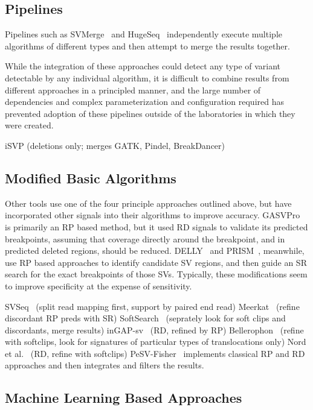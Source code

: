 \subsection{Pipelines}

Pipelines such as SVMerge~\cite{Wong:2010p1271} and HugeSeq~\cite{Lam:2012jy} independently execute multiple algorithms of different types and then attempt to merge the results together. 

While the integration of these approaches could detect any type of variant detectable by any individual algorithm, it is difficult to combine results from different approaches in a principled manner, and the large number of dependencies and complex parameterization and configuration required has prevented adoption of these pipelines outside of the laboratories in which they were created.

iSVP (deletions only; merges GATK, Pindel, BreakDancer)~\cite{Mimori:2013wx}

\subsection{Modified Basic Algorithms}

Other tools use one of the four principle approaches outlined above, but have incorporated other signals into their algorithms to improve accuracy. GASVPro~\cite{Sindi:2012kk} is primarily an RP based method, but it used RD signals to validate its predicted breakpoints, assuming that coverage directly around the breakpoint, and in predicted deleted regions, should be reduced. DELLY~\cite{Rausch:2012he} and PRISM~\cite{Jiang:2012cp}, meanwhile, use RP based approaches to identify candidate SV regions, and then guide an SR search for the exact breakpoints of those SVs. Typically, these modifications seem to improve specificity at the expense of sensitivity.

SVSeq~\cite{Zhang:2011ku} (split read mapping first, support by paired end read)
Meerkat~\cite{Yang:2013ih} (refine discordant RP preds with SR)
SoftSearch~\cite{Hart:2013fv} (seprately look for soft clips and discordants, merge results)
inGAP-sv~\cite{Qi:2011gu} (RD, refined by RP)
Bellerophon~\cite{Hayes:2013cq} (refine with softclips, look for signatures of particular types of translocations only)
Nord et al.~\cite{Nord:2011ks} (RD, refine with softclips)
PeSV-Fisher~\cite{Escaramis:2013dm} implements classical RP and RD approaches and then integrates and filters the results.

\subsection{Machine Learning Based Approaches}

